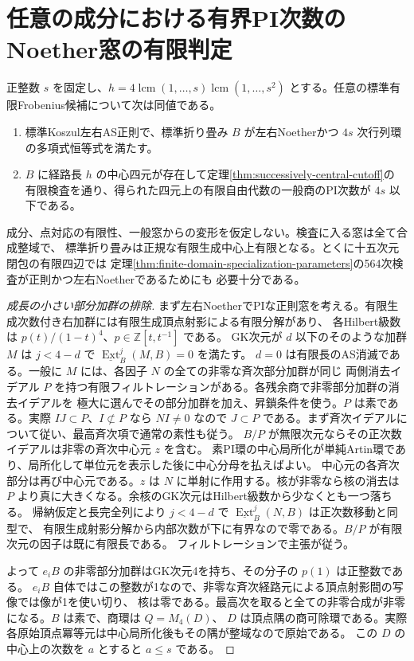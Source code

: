 \section{任意の成分における有界PI次数のNoether窓の有限判定}
\label{sec:noetherian-pi-window-cutoff}
\begin{theorem}\label{thm:noetherian-pi-window-cutoff}
正整数 $s$ を固定し、$h=4\operatorname{lcm}(1,\ldots,s)\operatorname{lcm}(1,\ldots,s^2)$
とする。任意の標準有限Frobenius候補について次は同値である。
\begin{enumerate}
\item 標準Koszul左右AS正則で、標準折り畳み $B$ が左右Noetherかつ
$4s$ 次行列環の多項式恒等式を満たす。
\item $B$ に経路長 $h$ の中心四元が存在して定理\ref{thm:successively-central-cutoff}の
有限検査を通り、得られた四元上の有限自由代数の一般商のPI次数が $4s$ 以下である。
\end{enumerate}
成分、点対応の有限性、一般窓からの変形を仮定しない。検査に入る窓は全て合成整域で、
標準折り畳みは正規な有限生成中心上有限となる。とくに十五次元閉包の有限四辺では
定理\ref{thm:finite-domain-specialization-parameters}の564次検査が正則かつ左右Noetherであるためにも
必要十分である。
\end{theorem}
\begin{proof}[成長の小さい部分加群の排除]
まず左右NoetherでPIな正則窓を考える。有限生成次数付き右加群には有限生成頂点射影による有限分解があり、
各Hilbert級数は $p(t)/(1-t)^4$、$p\in\mathbb Z[t,t^{-1}]$ である。
GK次元が $d$ 以下のそのような加群 $M$ は $j<4-d$ で $\underline{\operatorname{Ext}}^j_B(M,B)=0$ を満たす。
$d=0$ は有限長のAS消滅である。一般に $M$ には、各因子 $N$ の全ての非零な斉次部分加群が同じ
両側消去イデアル $P$ を持つ有限フィルトレーションがある。各残余商で非零部分加群の消去イデアルを
極大に選んでその部分加群を加え、昇鎖条件を使う。$P$ は素である。実際 $IJ\subset P$、$I\not\subset P$
なら $NI\ne0$ なので $J\subset P$ である。まず斉次イデアルについて従い、最高斉次項で通常の素性も従う。
$B/P$ が無限次元ならその正次数イデアルは非零の斉次中心元 $z$ を含む。
素PI環の中心局所化が単純Artin環であり、局所化して単位元を表示した後に中心分母を払えばよい。
中心元の各斉次部分は再び中心元である。$z$ は $N$ に単射に作用する。核が非零なら核の消去は
$P$ より真に大きくなる。余核のGK次元はHilbert級数から少なくとも一つ落ちる。
帰納仮定と長完全列により $j<4-d$ で $\underline{\operatorname{Ext}}^j_B(N,B)$ は正次数移動と同型で、
有限生成射影分解から内部次数が下に有界なので零である。$B/P$ が有限次元の因子は既に有限長である。
フィルトレーションで主張が従う。

よって $e_iB$ の非零部分加群はGK次元4を持ち、その分子の $p(1)$ は正整数である。
$e_iB$ 自体ではこの整数が1なので、非零な斉次経路元による頂点射影間の写像では像が1を使い切り、
核は零である。最高次を取ると全ての非零合成が非零になる。$B$ は素で、商環は $Q=M_4(D)$、
$D$ は頂点隅の商可除環である。実際各原始頂点冪等元は中心局所化後もその隅が整域なので原始である。
この $D$ の中心上の次数を $a$ とすると $a\le s$ である。
\end{proof}

